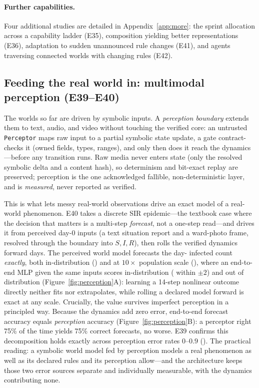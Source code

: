 \documentclass[11pt]{article}
\begin{document}
\paragraph{Further capabilities.} Four additional studies are detailed in Appendix~\ref{app:more}: the sprint allocation across a capability ladder (E35), composition yielding better representations (E36), adaptation to sudden unannounced rule changes (E41), and agents traversing connected worlds with changing rules (E42).

\subsection{Feeding the real world in: multimodal perception (E39--E40)}\label{sec:perception}
The worlds so far are driven by symbolic inputs. A \emph{perception boundary}
extends them to text, audio, and video without touching the verified core: an
untrusted \texttt{Perceptor} maps raw input to a partial symbolic state update,
a gate contract-checks it (owned fields, types, ranges), and only then does it
reach the dynamics---before any transition runs. Raw media never enters state
(only the resolved symbolic delta and a content hash), so determinism and
bit-exact replay are preserved; perception is the one acknowledged fallible,
non-deterministic layer, and is \emph{measured}, never reported as verified.

This is what lets messy real-world observations drive an exact model of a
real-world phenomenon. E40 takes a discrete SIR epidemic---the textbook case
where the decision that matters is a multi-step \emph{forecast}, not a one-step
read---and drives it from perceived day-0 inputs (a text situation report and a
ward-photo frame, resolved through the boundary into $S,I,R$), then rolls the
verified dynamics forward \PercHorizon{} days. The perceived world model
forecasts the day-\PercHorizon{} infected count \emph{exactly}, both
in-distribution (\PercWorldIn) and at $10\times$ population scale
(\PercWorldOod), where an end-to-end MLP given the same inputs scores
\PercMlpIn{} in-distribution (\PercMlpInTol{} within $\pm2$) and \PercMlpOod{}
out of distribution (Figure~\ref{fig:perception}A): learning a 14-step
nonlinear outcome directly neither fits nor extrapolates, while rolling a
declared model forward is exact at any scale. Crucially, the value survives
imperfect perception in a principled way. Because the dynamics add zero error,
end-to-end forecast accuracy equals \emph{perception} accuracy
(Figure~\ref{fig:perception}B): a perceptor right 75\% of the time yields 75\%
correct forecasts, no worse. E39 confirms this decomposition holds exactly
across perception error rates $0$--$0.9$ (\PercDecompHolds). The practical
reading: a symbolic world model fed by perception models a real phenomenon as
well as its declared rules and its perception allow---and the architecture
keeps those two error sources separate and individually measurable, with the
dynamics contributing none.
\end{document}
